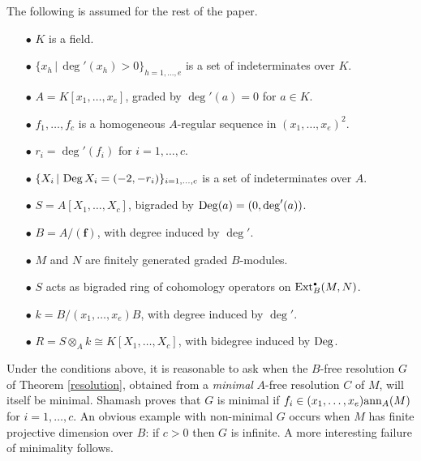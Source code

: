 \begin{notation}
\label{graded stuff}
The following is assumed for the rest of the paper.
\begin{itemize}
\item[$\bullet$]
$K$ is a field.
\item[$\bullet$]
$\{x_h\,\vert\,\deg'(x_h)>0\}_{h=1,\dots,e}$ is a set of
indeterminates over $K$.
\item[$\bullet$]
$A=K[x_1,\dots,x_e]$, graded by $\deg'(a)=0$ for $a\in K$.
\item[$\bullet$]
$f_1,\dots,f_c$ is a homogeneous $A$-regular sequence
in $(x_1,\dots,x_e)^2$.
\item[$\bullet$]
$r_i=\deg'(f_i)$ for $i=1,\dots,c$.
\item[$\bullet$]
$\{X_i\,\vert\,\operatorname{Deg} X_i=(-2,-r_i)\}_{i=1,\dots,c}$ is a set
of indeterminates over $A$.
\item[$\bullet$]
$S=A[X_1,\dots, X_c]$, bigraded by $\operatorname{Deg}(a)=(0,\deg'(a))$.
\item[$\bullet$]
$B=A/({\boldsymbol f})$, with degree induced by $\deg'$.
\item[$\bullet$]
$M$ and $N$ are finitely generated graded $B$-modules.
\item[$\bullet$]
$S$ acts as bigraded ring of cohomology operators on
$\operatorname{Ext}^{\scriptscriptstyle\bullet}_B(M,N)$.
\item[$\bullet$]
$k=B/(x_1,\dots,x_e)B$, with degree induced by $\deg'$.
\item[$\bullet$]
$R=S\otimes_A k\cong K[X_1,\dots,X_c]$, with bidegree induced by
$\operatorname{Deg}$.
\end{itemize}
 \end{notation}

\begin{Remark}
Under the conditions above, it is reasonable to ask when the $B$-free
resolution $G$ of Theorem \ref{resolution}, obtained from a {\it
minimal\/} $A$-free resolution $C$ of $M$, will itself be minimal.
Shamash \cite[Sect.~3]{CI:Sh} proves that $G$ is minimal if
$f_i\in(x_1,\dots,x_e){\operatorname{ann}}_A(M)$ for $i=1,\dots,c$.  An obvious example
with non-minimal $G$ occurs when $M$ has finite projective dimension
over $B$: if $c>0$ then $G$ is infinite.  A more interesting failure of
minimality follows.
 \end{Remark}

